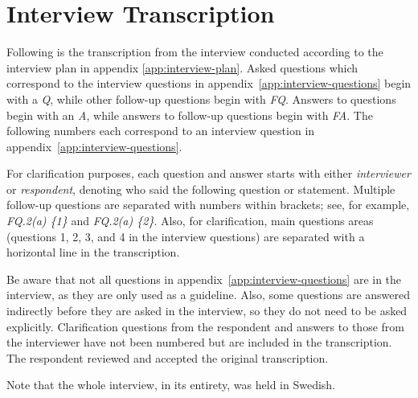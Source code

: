 \chapter{Interview Transcription}\label{app:interview-transcription}
Following is the transcription from the interview conducted according to the interview plan in appendix \vref{app:interview-plan}. Asked questions which correspond to the interview questions in appendix~\ref{app:interview-questions} begin with a \textit{Q}, while other follow-up questions begin with \textit{FQ}. Answers to questions begin with an \textit{A}, while answers to follow-up questions begin with \textit{FA}. The following numbers each correspond to an interview question in appendix~\ref{app:interview-questions}.

For clarification purposes, each question and answer starts with either \textit{interviewer} or \textit{respondent}, denoting who said the following question or statement. Multiple follow-up questions are separated with numbers within brackets; see, for example, \textit{FQ.2(a) \{1\}} and \textit{FQ.2(a) \{2\}}. Also, for clarification, main questions areas (questions 1, 2, 3, and 4 in the interview questions) are separated with a horizontal line in the transcription.

Be aware that not all questions in appendix~\ref{app:interview-questions} are in the interview, as they are only used as a guideline. Also, some questions are answered indirectly before they are asked in the interview, so they do not need to be asked explicitly. Clarification questions from the respondent and answers to those from the interviewer have not been numbered but are included in the transcription. The respondent reviewed and accepted the original transcription.

Note that the whole interview, in its entirety, was held in Swedish.

